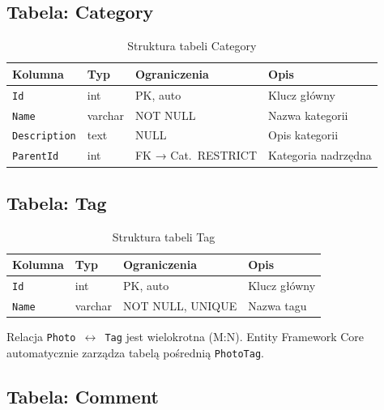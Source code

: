 \documentclass[12pt, a4paper]{article}
\begin{document}
\subsection{Tabela: Category}

\begin{table}[H]
  \centering
  \caption{Struktura tabeli Category}
  \begin{tabular}{@{}L{3cm}L{2.5cm}L{3cm}L{5cm}@{}}
    \toprule
    \textbf{Kolumna} & \textbf{Typ} & \textbf{Ograniczenia} & \textbf{Opis} \\
    \midrule
    \texttt{Id}          & int     & PK, auto          & Klucz główny \\
    \texttt{Name}        & varchar & NOT NULL          & Nazwa kategorii \\
    \texttt{Description} & text    & NULL              & Opis kategorii \\
    \texttt{ParentId}    & int     & FK → Cat.\ RESTRICT & Kategoria nadrzędna \\
    \bottomrule
  \end{tabular}
\end{table}

\subsection{Tabela: Tag}

\begin{table}[H]
  \centering
  \caption{Struktura tabeli Tag}
  \begin{tabular}{@{}L{3cm}L{2.5cm}L{3cm}L{5cm}@{}}
    \toprule
    \textbf{Kolumna} & \textbf{Typ} & \textbf{Ograniczenia} & \textbf{Opis} \\
    \midrule
    \texttt{Id}   & int     & PK, auto       & Klucz główny \\
    \texttt{Name} & varchar & NOT NULL, UNIQUE & Nazwa tagu \\
    \bottomrule
  \end{tabular}
\end{table}

Relacja \texttt{Photo $\leftrightarrow$ Tag} jest wielokrotna (M:N).
Entity Framework Core automatycznie zarządza tabelą pośrednią \texttt{PhotoTag}.

\subsection{Tabela: Comment}
\end{document}
